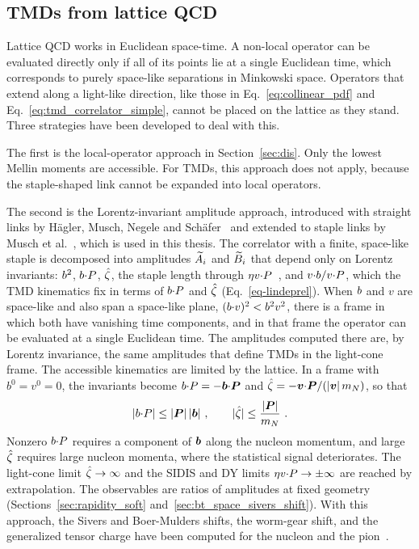 \subsection{TMDs from lattice QCD}
\label{sec:tmds_lattice_approaches}

Lattice QCD works in Euclidean space-time. A non-local operator can be evaluated directly only if all of its points lie at a single Euclidean time, which corresponds to purely space-like separations in Minkowski space. Operators that extend along a light-like direction, like those in Eq.~\eqref{eq:collinear_pdf} and Eq.~\eqref{eq:tmd_correlator_simple}, cannot be placed on the lattice as they stand. Three strategies have been developed to deal with this.

The first is the local-operator approach in Section~\ref{sec:dis}. Only the lowest Mellin moments are accessible. For TMDs, this approach does not apply, because the staple-shaped link cannot be expanded into local operators.

The second is the Lorentz-invariant amplitude approach, introduced with straight links by H\"agler, Musch, Negele and Sch\"afer~\cite{Hagler:2009mb,Musch:2010ka} and extended to staple links by Musch et al.~\cite{Musch:2011er}, which is used in this thesis. The correlator with a finite, space-like staple is decomposed into amplitudes $\widetilde{A}_i$ and $\widetilde{B}_i$ that depend only on Lorentz invariants: $b^2$, $b{\cdot} P$, ${\hat \zeta}$, the staple length through $\eta v{\cdot} P$~\cite{Goeke:2005hb,Musch:2011er}, and $v{\cdot}b/v{\cdot} P$, which the TMD kinematics fix in terms of $b{\cdot} P$ and ${\hat \zeta}$ (Eq.~\eqref{eq-lindeprel}). When $b$ and $v$ are space-like and also span a space-like plane, $(b{\cdot} v)^2<b^2v^2$, there is a frame in which both have vanishing time components, and in that frame the operator can be evaluated at a single Euclidean time. The amplitudes computed there are, by Lorentz invariance, the same amplitudes that define TMDs in the light-cone frame. The accessible kinematics are limited by the lattice. In a frame with $b^0 = v^0 = 0$, the invariants become $b{\cdot} P = -\boldsymbol{b}{\cdot}\boldsymbol{P}$ and ${\hat \zeta} = -\boldsymbol{v}{\cdot}\boldsymbol{P}/(|\boldsymbol{v}|\,m_N)$, so that
\begin{equation}
  |\bvec\tcdot P| \le |\vect{P}|\,|\vect{b}|\ ,\qquad |\zetahat| \le \frac{|\vect{P}|}{\mN} \ .
\end{equation}
Nonzero $b{\cdot} P$ requires a component of $\boldsymbol{b}$ along the nucleon momentum, and large ${\hat \zeta}$ requires large nucleon momenta, where the statistical signal deteriorates. The light-cone limit ${\hat \zeta}\to\infty$ and the SIDIS and DY limits $\eta v{\cdot} P\to\pm\infty$ are reached by extrapolation. The observables are ratios of amplitudes at fixed geometry (Sections~\ref{sec:rapidity_soft} and~\ref{sec:bt_space_sivers_shift}). With this approach, the Sivers and Boer-Mulders shifts, the worm-gear shift, and the generalized tensor charge have been computed for the nucleon and the pion~\cite{Musch:2011er,Engelhardt:2015xja,Yoon:2015ocs,Yoon:2017qzo}.

